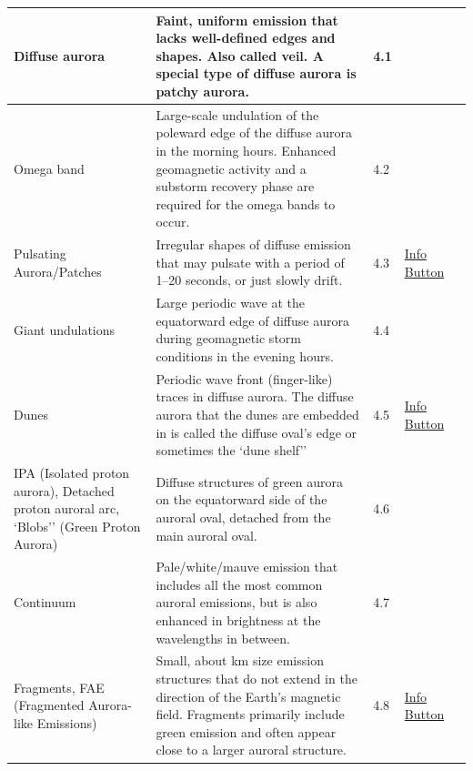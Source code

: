 \documentclass{article}
\begin{document}
\begin{longtable}{|p{1.5cm}|p{6.5cm}|p{1cm}|p{1.75cm}|p{1.8cm}|}
Diffuse aurora & Faint, uniform emission that lacks well-defined edges and shapes. Also called veil. A special type of diffuse aurora is patchy aurora. & 4.1 &  & \textcite{Nishimura2020} \\
\hline
Omega band & Large-scale undulation of the poleward edge of the diffuse aurora in the morning hours. Enhanced geomagnetic activity and a substorm recovery phase are required for the omega bands to occur. & 4.2 &  & \textcite{Sato2017} \\
\hline
Pulsating Aurora/Patches & Irregular shapes of diffuse emission that may pulsate with a period of 1--20 seconds, or just slowly drift. & 4.3 & \href{https://www.taivaanvahti.fi/observations/info/1031/en}{Info Button} & \textcite{Nishimura2020} \\
\hline
Giant undulations & Large periodic wave at the equatorward edge of diffuse aurora during geomagnetic storm conditions in the evening hours. & 4.4 &  & \textcite{Zou2021} \\
\hline
Dunes & Periodic wave front (finger-like) traces in diffuse aurora. The diffuse aurora that the dunes are embedded in is called the diffuse oval's edge or sometimes the `dune shelf'' & 4.5 & \href{https://www.taivaanvahti.fi/observations/info/546/en}{Info Button} & \textcite{Palmroth2020}\\
\hline
IPA (Isolated proton aurora), Detached proton auroral arc, `Blobs'' (Green Proton Aurora) & Diffuse structures of green aurora on the equatorward side of the auroral oval, detached from the main auroral oval. & 4.6 &  & \textcite{Liang2022} \\
\hline
Continuum & Pale/white/mauve emission that includes all the most common auroral emissions, but is also enhanced in brightness at the wavelengths in between. & 4.7 &  & \textcite{Gillies2019} \\
\hline
Fragments, FAE (Fragmented Aurora-like Emissions) & Small, about km size emission structures that do not extend in the direction of the Earth's magnetic field. Fragments primarily include green emission and often appear close to a larger auroral structure. & 4.8 & \href{https://www.taivaanvahti.fi/observations/info/1031/en}{Info Button} & \textcite{Dreyer2021}\\
\hline


\end{longtable}
\end{document}
